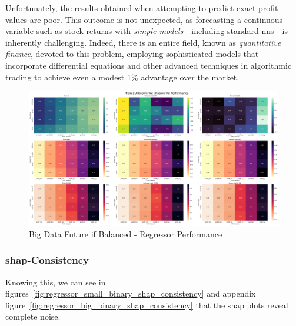 \documentclass[11pt,english,a4paper,hidelinks]{book}
\begin{document}
\noindent Unfortunately, the results obtained when attempting to predict exact profit values are poor. This outcome is not unexpected, as forecasting a continuous variable such as stock returns with \textit{simple models}—including standard \acrshort{nn}s—is inherently challenging. Indeed, there is an entire field, known as \textit{quantitative finance}, devoted to this problem, employing sophisticated models that incorporate differential equations and other advanced techniques in algorithmic trading to achieve even a modest 1\% advantage over the market.

\begin{figure}[H]
    \centering
    \includegraphics[width=1\textwidth]{images/code/models/neural_network/regressor_nn/Big Data future - IF HARD Balanced/performance summary.png}
    \caption{Big Data Future \acrshort{if} Balanced - Regressor Performance}
    \label{fig:regressor}
\end{figure}

\subsubsection{\acrshort{shap}-Consistency}

Knowing this, we can see in figures~\ref{fig:regressor_small_binary_shap_consistency} and appendix figure~\ref{fig:regressor_big_binary_shap_consistency} that the \acrshort{shap} plots reveal complete noise.
\end{document}
